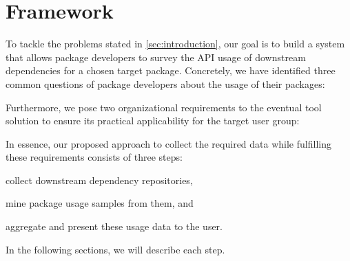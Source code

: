\section{Framework}
\label{sec:framework}

To tackle the problems stated in \cref{sec:introduction}, our goal is to build a system that allows package developers to survey the API usage of downstream dependencies for a chosen target package.
Concretely, we have identified three common questions of package developers about the usage of their packages:


Furthermore, we pose two organizational requirements to the eventual tool solution to ensure its practical applicability for the target user group:


In essence, our proposed approach to collect the required data while fulfilling these requirements consists of three steps:
\begin{enumerate*}[label=(\roman*)]
	\item collect downstream dependency repositories,
	\item mine package usage samples from them,
	and \item aggregate and present these usage data to the user.
\end{enumerate*}
In the following sections, we will describe each step.
